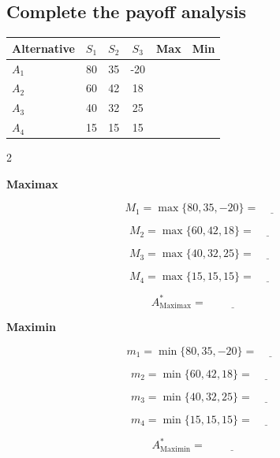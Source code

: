 	\subsection*{Complete the payoff analysis}
	
	\begin{center}
		\renewcommand{\arraystretch}{1.8}
		\begin{tabular}{lccccc}
			\toprule
			Alternative & $S_1$ & $S_2$ & $S_3$ & Max & Min \\
			\midrule
			$A_1$ & 80 & 35 & -20 & \underline{\hspace{1.5cm}} & \underline{\hspace{1.5cm}}\\[3pt]
			$A_2$ & 60 & 42 & 18 & \underline{\hspace{1.5cm}} & \underline{\hspace{1.5cm}}\\[3pt]
			$A_3$ & 40 & 32 & 25 & \underline{\hspace{1.5cm}} & \underline{\hspace{1.5cm}}\\[3pt]
			$A_4$ & 15 & 15 & 15 & \underline{\hspace{1.5cm}} & \underline{\hspace{1.5cm}}\\
			\bottomrule
		\end{tabular}
	\end{center}
	
	\begin{multicols}{2}
		
		\textbf{Maximax}
		
		\[
		M_1=\max\{80,35,-20\}=\underline{\hspace{1cm}}
		\]
		
		\[
		M_2=\max\{60,42,18\}=\underline{\hspace{1cm}}
		\]
		
		\[
		M_3=\max\{40,32,25\}=\underline{\hspace{1cm}}
		\]
		
		\[
		M_4=\max\{15,15,15\}=\underline{\hspace{1cm}}
		\]
		
		\[
		A^*_{\mathrm{Maximax}}
		=\underline{\hspace{2cm}}
		\]
		
		\columnbreak
		
		\textbf{Maximin}
		
		\[
		m_1=\min\{80,35,-20\}=\underline{\hspace{1cm}}
		\]
		
		\[
		m_2=\min\{60,42,18\}=\underline{\hspace{1cm}}
		\]
		
		\[
		m_3=\min\{40,32,25\}=\underline{\hspace{1cm}}
		\]
		
		\[
		m_4=\min\{15,15,15\}=\underline{\hspace{1cm}}
		\]
		
		\[
		A^*_{\mathrm{Maximin}}
		=\underline{\hspace{2cm}}
		\]
		
	\end{multicols}
	
